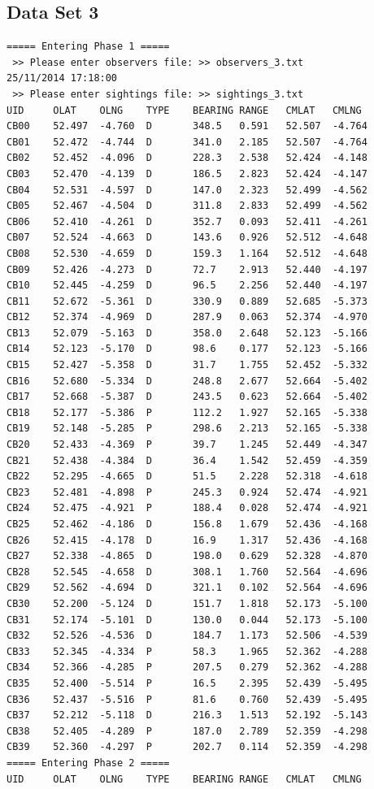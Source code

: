 \documentclass[10pt]{article}
\begin{document}
        \newpage
        \subsection{Data Set 3}
            \begin{verbatim}
===== Entering Phase 1 =====
 >> Please enter observers file: >> observers_3.txt
25/11/2014 17:18:00
 >> Please enter sightings file: >> sightings_3.txt
UID     OLAT    OLNG    TYPE    BEARING RANGE   CMLAT   CMLNG
CB00    52.497  -4.760  D       348.5   0.591   52.507  -4.764
CB01    52.472  -4.744  D       341.0   2.185   52.507  -4.764
CB02    52.452  -4.096  D       228.3   2.538   52.424  -4.148
CB03    52.470  -4.139  D       186.5   2.823   52.424  -4.147
CB04    52.531  -4.597  D       147.0   2.323   52.499  -4.562
CB05    52.467  -4.504  D       311.8   2.833   52.499  -4.562
CB06    52.410  -4.261  D       352.7   0.093   52.411  -4.261
CB07    52.524  -4.663  D       143.6   0.926   52.512  -4.648
CB08    52.530  -4.659  D       159.3   1.164   52.512  -4.648
CB09    52.426  -4.273  D       72.7    2.913   52.440  -4.197
CB10    52.445  -4.259  D       96.5    2.256   52.440  -4.197
CB11    52.672  -5.361  D       330.9   0.889   52.685  -5.373
CB12    52.374  -4.969  D       287.9   0.063   52.374  -4.970
CB13    52.079  -5.163  D       358.0   2.648   52.123  -5.166
CB14    52.123  -5.170  D       98.6    0.177   52.123  -5.166
CB15    52.427  -5.358  D       31.7    1.755   52.452  -5.332
CB16    52.680  -5.334  D       248.8   2.677   52.664  -5.402
CB17    52.668  -5.387  D       243.5   0.623   52.664  -5.402
CB18    52.177  -5.386  P       112.2   1.927   52.165  -5.338
CB19    52.148  -5.285  P       298.6   2.213   52.165  -5.338
CB20    52.433  -4.369  P       39.7    1.245   52.449  -4.347
CB21    52.438  -4.384  D       36.4    1.542   52.459  -4.359
CB22    52.295  -4.665  D       51.5    2.228   52.318  -4.618
CB23    52.481  -4.898  P       245.3   0.924   52.474  -4.921
CB24    52.475  -4.921  P       188.4   0.028   52.474  -4.921
CB25    52.462  -4.186  D       156.8   1.679   52.436  -4.168
CB26    52.415  -4.178  D       16.9    1.317   52.436  -4.168
CB27    52.338  -4.865  D       198.0   0.629   52.328  -4.870
CB28    52.545  -4.658  D       308.1   1.760   52.564  -4.696
CB29    52.562  -4.694  D       321.1   0.102   52.564  -4.696
CB30    52.200  -5.124  D       151.7   1.818   52.173  -5.100
CB31    52.174  -5.101  D       130.0   0.044   52.173  -5.100
CB32    52.526  -4.536  D       184.7   1.173   52.506  -4.539
CB33    52.345  -4.334  P       58.3    1.965   52.362  -4.288
CB34    52.366  -4.285  P       207.5   0.279   52.362  -4.288
CB35    52.400  -5.514  P       16.5    2.395   52.439  -5.495
CB36    52.437  -5.516  P       81.6    0.760   52.439  -5.495
CB37    52.212  -5.118  D       216.3   1.513   52.192  -5.143
CB38    52.405  -4.289  P       187.0   2.789   52.359  -4.298
CB39    52.360  -4.297  P       202.7   0.114   52.359  -4.298
===== Entering Phase 2 =====
UID     OLAT    OLNG    TYPE    BEARING RANGE   CMLAT   CMLNG


\end{verbatim}
\end{document}
